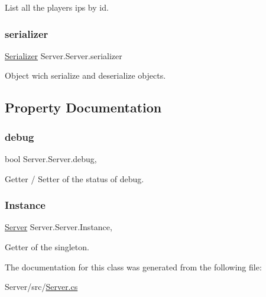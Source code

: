 List all the player\textquotesingle{}s ips by id. \mbox{\label{class_server_1_1_server_aca27435969e9497574ce1a886bd8aa82}} 
\subsubsection{\texorpdfstring{serializer}{serializer}}
{\footnotesize\ttfamily \hyperlink{class_common_1_1_serializer}{Serializer} Server.\+Server.\+serializer}

Object wich serialize and deserialize objects. 

\subsection{Property Documentation}
\mbox{\label{class_server_1_1_server_a944c5350249b3be31a0d9b6762e49512}} 
\subsubsection{\texorpdfstring{debug}{debug}}
{\footnotesize\ttfamily bool Server.\+Server.\+debug\hspace{0.3cm}{\ttfamily [get]}, {\ttfamily [set]}}

Getter / Setter of the status of debug. \mbox{\label{class_server_1_1_server_a6660837e8cc96449219c2c0f0c4afbf9}} 
\subsubsection{\texorpdfstring{Instance}{Instance}}
{\footnotesize\ttfamily \hyperlink{class_server_1_1_server}{Server} Server.\+Server.\+Instance\hspace{0.3cm}{\ttfamily [static]}, {\ttfamily [get]}}

Getter of the singleton. 

The documentation for this class was generated from the following file\+:\begin{DoxyCompactItemize}
\item 
Server/src/\hyperlink{_server_8cs}{Server.\+cs}\end{DoxyCompactItemize}
